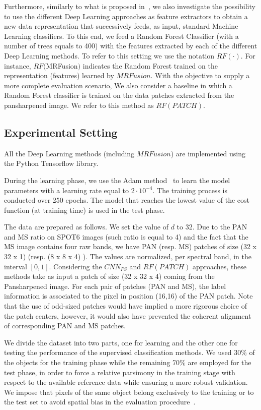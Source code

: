 \documentclass[journal]{IEEEtran}
\newcommand{\method}{$MRFusion$}
\begin{document}
Furthermore, similarly to what is proposed in~\cite{IencoGDM17}, we also investigate the possibility to use the different Deep Learning approaches as feature extractors to obtain a new data representation that successively feeds, as input, standard Machine Learning classifiers. To this end, we feed a Random Forest Classifier (with a number of trees equals to 400) with the features extracted by each of the different Deep Learning methods. To refer to this setting we use the notation $RF(\cdot)$. For instance, $RF(\method)$ indicates the Random Forest trained on the representation (features) learned by \method{}. With the objective to supply a more complete evaluation scenario, We also consider a baseline in which a Random Forest classifier is trained on the data patches extracted from the pansharpened image. We refer to this method as $RF(PATCH)$.

\subsection{Experimental Setting}
All the Deep Learning methods (including \method{}) are implemented using the Python Tensorflow library. 

During the learning phase, we use the Adam method~\cite{KingmaB14} to learn the model parameters with a learning rate equal to $2 \cdot 10^{-4}$. The training process is conducted over 250 epochs. The model that reaches the lowest value of the cost function (at training time) is used in the test phase.

The data are prepared as follows. We set the value of $d$ to 32. Due to the PAN and MS ratio on SPOT6 images (such ratio is equal to 4) and the fact that the MS image contains four raw bands, we have PAN (resp. MS) patches of size (32 x 32 x 1) (resp. (8 x 8 x 4) ). The values are normalized, per spectral band, in the interval $[0,1]$. Considering the $CNN_{PS}$ and $RF(PATCH)$ approaches, these methods take as input a patch of size (32 x 32 x 4) coming from the Pansharpened image. For each pair of patches (PAN and MS), the label information is associated to the pixel in position (16,16) of the PAN patch. Note that the use of odd-sized patches would have implied a more rigorous choice of the patch centers, however, it would also have prevented the coherent alignment of corresponding PAN and MS patches.

We divide the dataset into two parts, one for learning and the other one for testing the performance of the supervised classification methods. We used 30\% of the objects for the training phase while the remaining 70\% are employed for the test phase, in order to force a relative parsimony in the training stage with respect to the available reference data while ensuring a more robust validation. We impose that pixels of the same object belong exclusively to the training or to the test set to avoid spatial bias in the evaluation procedure~\cite{IngladaVATMR17}. 
\end{document}
